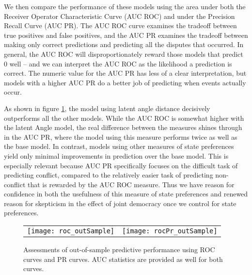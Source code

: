 We then compare the performance of these models using the area under both the Receiver Operator Characteristic Curve (AUC ROC) and under the Precision Recall Curve (AUC PR). The AUC ROC curve examines the tradeoff between true positives and false positives, and the AUC PR examines the tradeoff between making only correct predictions and predicting all the disputes that occurred. In general, the AUC ROC will disproportionately reward those models that predict $0$ well -- and we can interpret the AUC ROC as the likelihood a prediction is correct. The numeric value for the AUC PR has less of a clear interpretation, but models with a higher AUC PR do a better job of predicting when events actually occur.

As shown in figure \ref{fig:roc}, the model using latent angle distance decisively outperforms all the other models. While the AUC ROC is somewhat higher with the latent Angle model, the real difference between the measures shines through in the AUC PR, where the model using this measure performs twice as well as the base model. In contrast, models using other measures of state preferences yield only minimal improvements in prediction over the base model. This is especially relevant because AUC PR specifically focuses on the difficult task of predicting conflict, compared to the relatively easier task of predicting non-conflict that is rewarded by the AUC ROC measure. Thus we have reason for confidence in both the usefulness of this measure of state preferences and renewed reason for skepticism in the effect of joint democracy once we control for state preferences. 

\begin{figure}[ht]
	\centering
	\begin{tabular}{cc}
	\texttt{[image: roc\_outSample]} & 
	\texttt{[image: rocPr\_outSample]}	
	\end{tabular}
	\caption{Assessments of out-of-sample predictive performance using ROC curves and PR curves. AUC statistics are provided as well for both curves.}
	\label{fig:roc}
\end{figure}
\FloatBarrier
